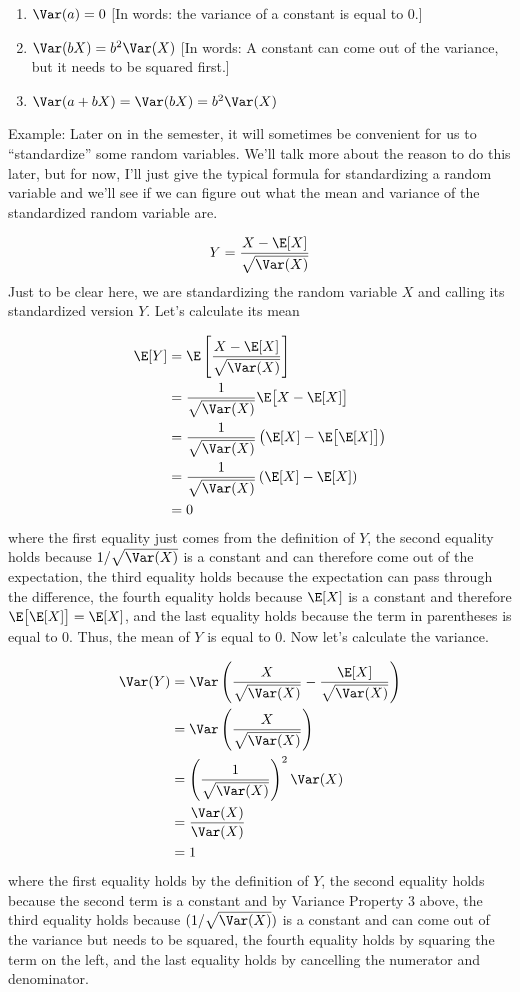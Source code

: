 \documentclass[
  letterpaper,
  DIV=11,
  numbers=noendperiod]{scrreprt}
\begin{document}
\begin{enumerate}
\def\labelenumi{\arabic{enumi}.}
\item
  \(\Var(a) = 0\) {[}In words: the variance of a constant is equal to
  0.{]}
\item
  \(\Var(bX) = b^2 \Var(X)\) {[}In words: A constant can come out of the
  variance, but it needs to be squared first.{]}
\item
  \(\Var(a + bX) = \Var(bX) = b^2 \Var(X)\)
\end{enumerate}

{Example: }Later on in the semester, it will sometimes be convenient for
us to ``standardize'' some random variables. We'll talk more about the
reason to do this later, but for now, I'll just give the typical formula
for standardizing a random variable and we'll see if we can figure out
what the mean and variance of the standardized random variable are.

\[
  Y = \frac{ X - \E[X]}{\sqrt{\Var(X)}}
\] Just to be clear here, we are standardizing the random variable \(X\)
and calling its standardized version \(Y\). Let's calculate its mean

\[
  \begin{aligned}
    \E[Y] &= \E\left[ \frac{X - \E[X]}{\sqrt{\Var(X)}} \right] \\
    &= \frac{1}{\sqrt{\Var(X)}} \E\big[ X - \E[X] \big] \\
    &= \frac{1}{\sqrt{\Var(X)}} \left( \E[X] - \E\big[\E[X]\big] \right) \\
    &= \frac{1}{\sqrt{\Var(X)}} \left( \E[X] - \E[X] \right) \\
    &= 0
  \end{aligned}
\] where the first equality just comes from the definition of \(Y\), the
second equality holds because \(1/\sqrt{\Var(X)}\) is a constant and can
therefore come out of the expectation, the third equality holds because
the expectation can pass through the difference, the fourth equality
holds because \(\E[X]\) is a constant and therefore
\(\E\big[\E[X]\big] = \E[X]\), and the last equality holds because the
term in parentheses is equal to 0. Thus, the mean of \(Y\) is equal to
0. Now let's calculate the variance.

\[
  \begin{aligned}
  \Var(Y) &= \Var\left( \frac{X}{\sqrt{\Var(X)}} - \frac{\E[X]}{\sqrt{\Var(X)}} \right) \\
  &= \Var\left( \frac{X}{\sqrt{\Var(X)}}\right) \\
  &= \left( \frac{1}{\sqrt{\Var(X)}} \right)^2 \Var(X) \\
  &= \frac{\Var(X)}{\Var(X)} \\
  &= 1
  \end{aligned}
\] where the first equality holds by the definition of \(Y\), the second
equality holds because the second term is a constant and by Variance
Property 3 above, the third equality holds because
\((1/\sqrt{\Var(X)})\) is a constant and can come out of the variance
but needs to be squared, the fourth equality holds by squaring the term
on the left, and the last equality holds by cancelling the numerator and
denominator.
\end{document}
